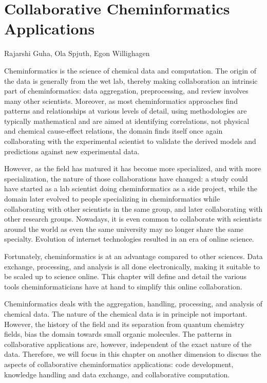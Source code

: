 \documentclass[11pt]{book}
\begin{document}
\chapter{Collaborative Cheminformatics Applications}

\begin{LARGE}
Rajarshi Guha, Ola Spjuth, Egon Willighagen
\end{LARGE}
\vspace{1.5cm}

Cheminformatics is the science of chemical data and computation.  The
origin of the data is generally from the wet lab,
thereby making collaboration an intrinsic part of cheminformatics:
data aggregation, preprocessing, and review involves many other
scientists. Moreover, as most cheminformatics approaches find
patterns and relationships at various levels of detail, using
methodologies are typically mathematical and are
aimed at identifying correlations, not physical and chemical
cause-effect relations, the domain finds itself once
again collaborating with the experimental scientist to validate
the derived models and predictions against new experimental data.

However, as the field has matured it has become more specialized,
and with more specialization, the nature of those collaborations
have changed: a study could have started as a lab scientist doing
cheminformatics as a side project, while the domain later evolved to people
specializing in cheminformatics while collaborating with other
scientists in the same group, and later collaborating with other
research groups. Nowadays, it is even common to collaborate with
scientists around the world as even the same university may no
longer share the same specialty. Evolution of internet technologies
resulted in an era of online science.

Fortunately, cheminformatics is at an advantage compared to
other sciences. Data exchange, processing, and analysis
is all done electronically, making it suitable to be
scaled up to science online. This chapter will define and detail the
various tools cheminformaticians have at hand to simplify
this online collaboration.

Cheminformatics deals with the aggregation, handling, processing, and
analysis of chemical data. The nature of the chemical data is in principle
not important. However, the history of the field and its separation from
quantum chemistry fields, bias the domain towards small organic molecules.
The patterns in collaborative applications are, however, independent of
the exact nature of the data. Therefore, we will focus in this chapter
on another dimension to discuss the aspects of collaborative
cheminformatics applications: code development, knowledge handling
and data exchange, and collaborative computation.
\end{document}
